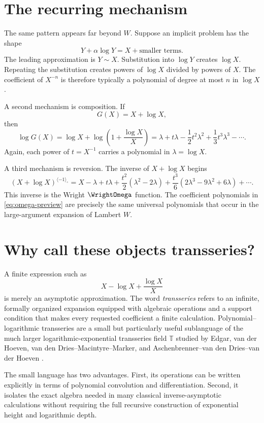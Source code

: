 \documentclass[11pt,openany]{book}
\theoremstyle{definition}
\theoremstyle{plain}
\theoremstyle{remark}
\newcommand{\T}{\mathbb{T}}
\newcommand{\invcomp}{^{\langle -1\rangle_{\circ}}}
\begin{document}
\section{The recurring mechanism}
The same pattern appears far beyond \(W\). Suppose an implicit problem has the shape
\[
 Y+\alpha\log Y=X+\text{smaller terms}.
\]
The leading approximation is \(Y\sim X\). Substitution into \(\log Y\) creates \(\log X\). Repeating the substitution creates powers of \(\log X\) divided by powers of \(X\). The coefficient of \(X^{-n}\) is therefore typically a polynomial of degree at most \(n\) in \(\log X\).

A second mechanism is composition. If
\[
 G(X)=X+\log X,
\]
then
\[
 \log G(X)=\log X+\log\left(1+\frac{\log X}{X}\right)
 =\lambda+t\lambda-\frac12t^2\lambda^2+\frac13t^3\lambda^3-\cdots.
\]
Again, each power of \(t=X^{-1}\) carries a polynomial in \(\lambda=\log X\).

A third mechanism is reversion. The inverse of \(X+\log X\) begins
\begin{equation}\label{eq:omega-preview}
 (X+\log X)\invcomp
 =X-\lambda+t\lambda
 +\frac{t^2}{2}(\lambda^2-2\lambda)
 +\frac{t^3}{6}(2\lambda^3-9\lambda^2+6\lambda)+\cdots.
\end{equation}
This inverse is the Wright \(\WrightOmega\) function. The coefficient polynomials in \cref{eq:omega-preview} are precisely the same universal polynomials that occur in the large-argument expansion of Lambert \(W\).

\section{Why call these objects transseries?}
A finite expression such as
\[
 X-\log X+\frac{\log X}{X}
\]
is merely an asymptotic approximation. The word \emph{transseries} refers to an infinite, formally organized expansion equipped with algebraic operations and a support condition that makes every requested coefficient a finite calculation. Polynomial--logarithmic transseries are a small but particularly useful sublanguage of the much larger logarithmic-exponential transseries field \(\T\) studied by Edgar, van der Hoeven, van den Dries--Macintyre--Marker, and Aschenbrenner--van den Dries--van der Hoeven \cite{edgar-beginners,edgar-composition,vdDMM-1997,vdDMM-2001,vdhoeven-book,adh-book}.

The small language has two advantages. First, its operations can be written explicitly in terms of polynomial convolution and differentiation. Second, it isolates the exact algebra needed in many classical inverse-asymptotic calculations without requiring the full recursive construction of exponential height and logarithmic depth.
\end{document}
